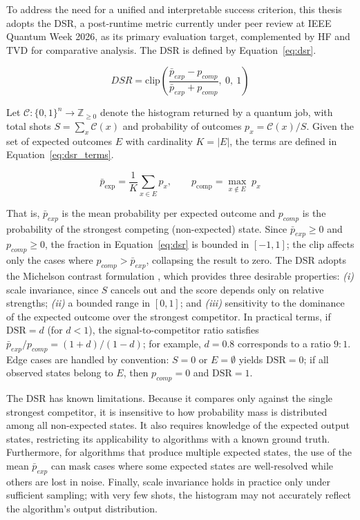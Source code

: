 \documentclass{article}
\begin{document}
To address the need for a unified and interpretable success criterion, this thesis adopts the DSR, a post-runtime metric currently under peer review at IEEE Quantum Week 2026, as its primary evaluation target, complemented by HF and TVD for comparative analysis. The DSR is defined by Equation~\eqref{eq:dsr}.

\begin{equation}
\label{eq:dsr}
DSR = \text{clip}\!\left(\frac{\bar{p}_{exp} - p_{comp}}{\bar{p}_{exp} + p_{comp}},\ 0,\ 1\right)
\end{equation}

\noindent Let $\mathcal{C} : \{0,1\}^n \to \mathbb{Z}_{\geq 0}$ denote the histogram returned by a quantum job, with total shots $S = \sum_{x} \mathcal{C}(x)$ and probability of outcomes $p_x = \mathcal{C}(x)/S$. Given the set of expected outcomes $E$ with cardinality $K = |E|$, the terms are defined in Equation~\eqref{eq:dsr_terms}.

\begin{equation}
\label{eq:dsr_terms}
\bar{p}_{\text{exp}} = \frac{1}{K}\sum_{x \in E} p_x, \qquad
p_{\text{comp}} = \max_{x \notin E}\; p_x
\end{equation}

\noindent That is, $\bar{p}_{exp}$ is the mean probability per expected outcome and $p_{comp}$ is the probability of the strongest competing (non-expected) state. Since $\bar{p}_{exp} \geq 0$ and $p_{comp} \geq 0$, the fraction in Equation~\eqref{eq:dsr} is bounded in $[-1, 1]$; the clip affects only the cases where $p_{comp} > \bar{p}_{exp}$, collapsing the result to zero. The DSR adopts the Michelson contrast formulation \cite{michelsonInterferenceMethods_1890, michelsonStudiesOptics_1927}, which provides three desirable properties: \emph{(i)} scale invariance, since $S$ cancels out and the score depends only on relative strengths; \emph{(ii)} a bounded range in $[0, 1]$; and \emph{(iii)} sensitivity to the dominance of the expected outcome over the strongest competitor. In practical terms, if $\mathrm{DSR} = d$ (for $d < 1$), the signal-to-competitor ratio satisfies $\bar{p}_{exp} / p_{comp} = (1 + d)/(1 - d)$; for example, $d = 0.8$ corresponds to a ratio $9{:}1$. Edge cases are handled by convention: $S = 0$ or $E = \emptyset$ yields $\mathrm{DSR} = 0$; if all observed states belong to $E$, then $p_{comp} = 0$ and $\mathrm{DSR} = 1$.

The DSR has known limitations. Because it compares only against the single strongest competitor, it is insensitive to how probability mass is distributed among all non-expected states. It also requires knowledge of the expected output states, restricting its applicability to algorithms with a known ground truth. Furthermore, for algorithms that produce multiple expected states, the use of the mean $\bar{p}_{exp}$ can mask cases where some expected states are well-resolved while others are lost in noise. Finally, scale invariance holds in practice only under sufficient sampling; with very few shots, the histogram may not accurately reflect the algorithm's output distribution.
\end{document}
